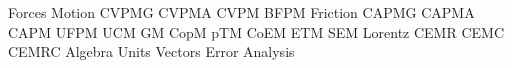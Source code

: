 Forces
Motion
CVPMG
CVPMA
CVPM
BFPM
Friction
CAPMG
CAPMA
CAPM
UFPM
UCM
GM
CopM
pTM
CoEM
ETM
SEM
Lorentz
CEMR
CEMC
CEMRC
Algebra
Units
Vectors
Error Analysis
